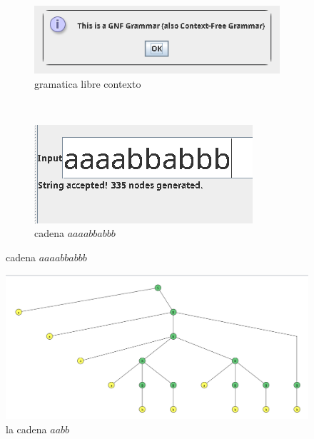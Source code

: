 \documentclass{article}
\begin{document}
\begin{figure}[h]
\begin{subfigure}[b]{0.55\textwidth}
                    \centering
                    \includegraphics[width=\textwidth]{./Imagenes/image2.png}
                    \caption{gramatica libre contexto}
                    \label{fig:label2}
                \end{subfigure}
                \vspace{0.5cm} 
                \\
                \begin{subfigure}[b]{0.35\textwidth}
                    \centering
                    \includegraphics[width=\textwidth]{./Imagenes/image3.png}
                    \caption{cadena $aaaabbabbb$}
                    \label{fig:label3}
                \end{subfigure}
                \label{fig:matrix1}
            \end{figure}

            \begin{figure}[!h]
                \centering
                \includegraphics[width=\textwidth]{./Imagenes/image4.png}
                \caption{la cadena $aabb$}
                \label{fig:label4}
            \end{figure}
            
\end{document}
